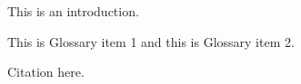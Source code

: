 
This is an introduction.

This is \gls{Glossary item 1} and this is \gls{Glossary item 2}.

Citation here\cite{Li2019}.

